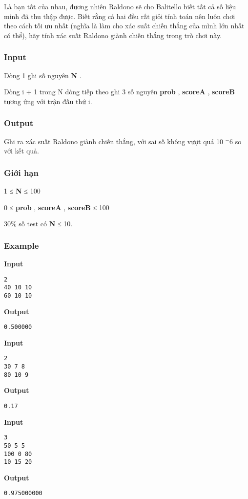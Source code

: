 Là bạn tốt của nhau, đương nhiên Raldono sẽ cho Balitello biết tất cả số liệu mình đã thu thập được. Biết rằng cả hai đều rất giỏi tính toán nên luôn chơi theo cách tối ưu nhất (nghĩa là làm cho xác suất chiến thắng của mình lớn nhất có thể), hãy tính xác suất Raldono giành chiến thắng trong trò chơi này.

\subsubsection{Input}

Dòng 1 ghi số nguyên \textbf{ N } .

Dòng i + 1 trong N dòng tiếp theo ghi 3 số nguyên \textbf{ prob } , \textbf{ scoreA } , \textbf{ scoreB } tương ứng với trận đấu thứ i.

\subsubsection{Output}

Ghi ra xác suất Raldono giành chiến thắng, với sai số không vượt quá 10 $^ -6 $ so với kết quả.

\subsubsection{Giới hạn}

1 ≤ \textbf{ N } ≤ 100

0 ≤ \textbf{ prob } , \textbf{ scoreA } , \textbf{ scoreB } ≤ 100

30\% số test có \textbf{ N } ≤ 10.

\subsubsection{Example}

\textbf{Input }
\begin{verbatim}
2
40 10 10
60 10 10\end{verbatim}

\textbf{Output }
\begin{verbatim}
0.500000\end{verbatim}

\textbf{Input }
\begin{verbatim}
2
30 7 8
80 10 9\end{verbatim}

\textbf{Output }
\begin{verbatim}
0.17\end{verbatim}

\textbf{Input }
\begin{verbatim}
3
50 5 5
100 0 80
10 15 20\end{verbatim}

\textbf{Output }
\begin{verbatim}
0.975000000\end{verbatim}